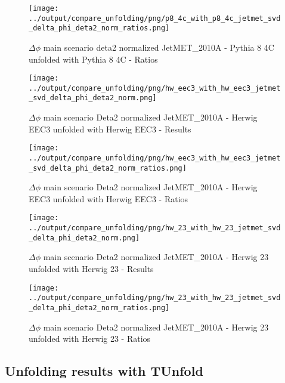 \documentclass[11pt]{book}
\begin{document}
\begin{figure}[ht]
\centering
\texttt{[image: ../output/compare\_unfolding/png/p8\_4c\_with\_p8\_4c\_jetmet\_svd\_delta\_phi\_deta2\_norm\_ratios.png]}
\caption{$\Delta\phi$ main scenario deta2 normalized JetMET\_2010A - Pythia 8 4C unfolded with Pythia 8 4C - Ratios}
\label{p8_p8_jetmet_svd_delta_phi_deta2_norm_b}
\end{figure}

\begin{figure}[ht]
\centering
\texttt{[image: ../output/compare\_unfolding/png/hw\_eec3\_with\_hw\_eec3\_jetmet\_svd\_delta\_phi\_deta2\_norm.png]}
\caption{$\Delta\phi$ main scenario Deta2 normalized JetMET\_2010A - Herwig EEC3 unfolded with Herwig EEC3 - Results}
\label{hw_eec3_hw_eec3_jetmet_svd_delta_phi_deta2_norm_a}
\end{figure}

\begin{figure}[ht]
\centering
\texttt{[image: ../output/compare\_unfolding/png/hw\_eec3\_with\_hw\_eec3\_jetmet\_svd\_delta\_phi\_deta2\_norm\_ratios.png]}
\caption{$\Delta\phi$ main scenario Deta2 normalized JetMET\_2010A - Herwig EEC3 unfolded with Herwig EEC3 - Ratios}
\label{hw_eec3_hw_eec3_jetmet_svd_delta_phi_deta2_norm_b}
\end{figure}

\begin{figure}[ht]
\centering
\texttt{[image: ../output/compare\_unfolding/png/hw\_23\_with\_hw\_23\_jetmet\_svd\_delta\_phi\_deta2\_norm.png]}
\caption{$\Delta\phi$ main scenario Deta2 normalized JetMET\_2010A - Herwig 23 unfolded with Herwig 23 - Results}
\label{hw_23_hw_23_jetmet_svd_delta_phi_deta2_norm_a}
\end{figure}

\begin{figure}[ht]
\centering
\texttt{[image: ../output/compare\_unfolding/png/hw\_23\_with\_hw\_23\_jetmet\_svd\_delta\_phi\_deta2\_norm\_ratios.png]}
\caption{$\Delta\phi$ main scenario Deta2 normalized JetMET\_2010A - Herwig 23 unfolded with Herwig 23 - Ratios}
\label{hw_23_hw_23_jetmet_svd_delta_phi_deta2_norm_b}
\end{figure}



\clearpage
\subsection{Unfolding results with TUnfold}
\end{document}
